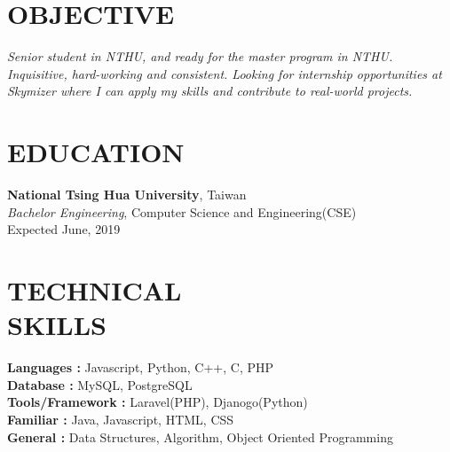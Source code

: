 \documentclass[margin]{res}
\begin{document}
\begin{resume}

\section{OBJECTIVE}
{\sl Senior student in NTHU, and ready for the master program in NTHU. Inquisitive, hard-working and consistent. Looking for internship opportunities at Skymizer where I can apply my skills and contribute to real-world projects. }

\section{EDUCATION}
\textbf{National Tsing Hua University}, Taiwan\\
{\sl Bachelor Engineering}, Computer Science and Engineering(CSE)\\
Expected June, 2019





\section{TECHNICAL\\SKILLS}

\textbf{Languages : } Javascript, Python, C++, C, PHP
\\
\textbf{Database :} MySQL, PostgreSQL
\\
\textbf{Tools/Framework : } Laravel(PHP), Djanogo(Python)
\\
\textbf{Familiar : } Java, Javascript, HTML, CSS
\\
\textbf{General : } Data Structures, Algorithm, Object Oriented Programming


\end{resume}
\end{document}
